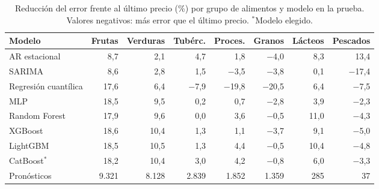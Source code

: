 \begin{table}[htbp]\centering\small
\caption{Reducción del error frente al último precio (\%) por grupo de alimentos y modelo en la prueba. Valores negativos: más error que el último precio. $^\ast$Modelo elegido.}\label{tab:grupos_modelos}
\begin{adjustbox}{max width=\textwidth}\begin{tabular}{lrrrrrrr}\toprule
Modelo & Frutas & Verduras & Tubérc. & Proces. & Granos & Lácteos & Pescados\\ \midrule
AR estacional & 8{,}7 & 2{,}1 & 4{,}7 & 1{,}8 & \ensuremath{-}4{,}0 & 8{,}3 & 13{,}4 \\
SARIMA & 8{,}6 & 2{,}8 & 1{,}5 & \ensuremath{-}3{,}5 & \ensuremath{-}3{,}8 & 0{,}1 & \ensuremath{-}17{,}4 \\
\midrule
Regresión cuantílica & 17{,}6 & 6{,}4 & \ensuremath{-}7{,}9 & \ensuremath{-}19{,}8 & \ensuremath{-}20{,}5 & 6{,}4 & \ensuremath{-}7{,}5 \\
MLP & 18{,}5 & 9{,}5 & 0{,}2 & 0{,}7 & \ensuremath{-}2{,}8 & 3{,}9 & \ensuremath{-}2{,}3 \\
Random Forest & 17{,}9 & 9{,}6 & 0{,}0 & 3{,}6 & \ensuremath{-}0{,}5 & 11{,}0 & \ensuremath{-}4{,}3 \\
XGBoost & 18{,}6 & 10{,}4 & 1{,}3 & 1{,}1 & \ensuremath{-}3{,}7 & 9{,}1 & \ensuremath{-}5{,}0 \\
LightGBM & 18{,}5 & 10{,}5 & 1{,}3 & 4{,}4 & \ensuremath{-}0{,}5 & 10{,}4 & \ensuremath{-}4{,}8 \\
CatBoost$^\ast$ & 18{,}2 & 10{,}4 & 3{,}0 & 4{,}2 & \ensuremath{-}0{,}8 & 6{,}0 & \ensuremath{-}3{,}3 \\
\midrule
Pronósticos & 9.321 & 8.128 & 2.839 & 1.852 & 1.359 & 285 & 37 \\
\bottomrule\end{tabular}\end{adjustbox}\end{table}
